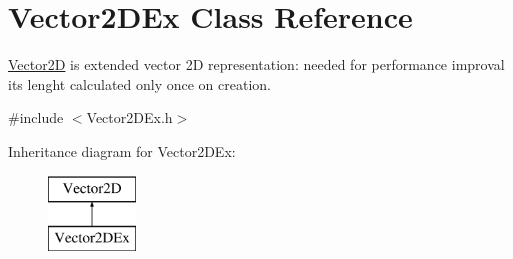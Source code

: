 \hypertarget{class_vector2_d_ex}{
\section{\-Vector2\-D\-Ex \-Class \-Reference}
\label{class_vector2_d_ex}
}


\hyperlink{class_vector2_d}{\-Vector2\-D} is extended vector 2\-D representation\-: needed for performance improval its lenght calculated only once on creation.  




{\ttfamily \#include $<$\-Vector2\-D\-Ex.\-h$>$}

\-Inheritance diagram for \-Vector2\-D\-Ex\-:\begin{figure}[H]
\begin{center}
\leavevmode
\includegraphics[height=2.000000cm]{class_vector2_d_ex}
\end{center}
\end{figure}
